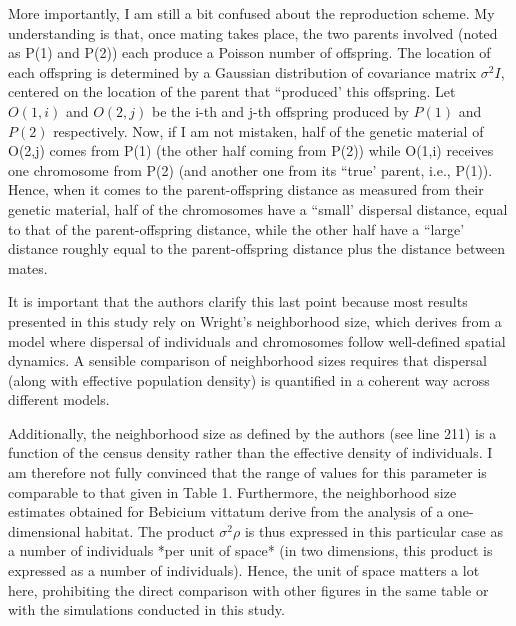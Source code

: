 \reply{
}

\begin{point}{}
More importantly, I am still a bit confused about the reproduction scheme. My understanding is that, once mating takes place, the two parents involved (noted as P(1) and P(2)) each produce a Poisson number of offspring. The location of each offspring is determined by a Gaussian distribution of covariance matrix $\sigma^2 I$, centered on the location of the parent that ``produced' this offspring. Let $O(1,i)$ and $O(2,j)$ be the i-th and j-th offspring produced by $P(1)$ and $P(2)$ respectively. Now, if I am not mistaken, half of the genetic material of O(2,j) comes from P(1) (the other half coming from P(2)) while O(1,i) receives one chromosome from P(2) (and another one from its ``true' parent, i.e., P(1)). Hence, when it comes to the parent-offspring distance as measured from their genetic material, half of the chromosomes have a ``small' dispersal distance, equal to that of the parent-offspring distance, while the other half have a ``large' distance roughly equal to the parent-offspring distance plus the distance between mates.
\end{point}

\reply{
}


\begin{point}{}
It is important that the authors clarify this last point because most results presented in this study rely on Wright's neighborhood size, which derives from a model where dispersal of individuals and chromosomes follow well-defined spatial dynamics. A sensible comparison of neighborhood sizes requires that dispersal (along with effective population density) is quantified in a coherent way across different models.
\end{point}

\reply{
}


\begin{point}{}
Additionally, the neighborhood size as defined by the authors (see line 211) is a function of the census density rather than the effective density of individuals. I am therefore not fully convinced that the range of values for this parameter is comparable to that given in Table 1. Furthermore, the neighborhood size estimates obtained for Bebicium vittatum derive from the analysis of a one-dimensional habitat. The product $\sigma^2 \rho$ is thus expressed in this particular case as a number of individuals *per unit of space* (in two dimensions, this product is expressed as a number of individuals). Hence, the unit of space matters a lot here, prohibiting the direct comparison with other figures in the same table or with the simulations conducted in this study.
\end{point}


